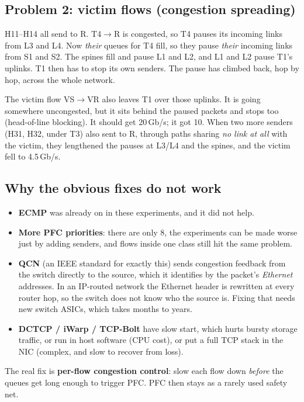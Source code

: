 \subsection{Problem 2: victim flows (congestion spreading)}

H11--H14 all send to R. T4$\to$R is congested, so T4 pauses its incoming links from L3 and L4. Now \emph{their} queues for T4 fill, so they pause
\emph{their} incoming links from S1 and S2. The spines fill and pause L1 and L2, and L1 and L2 pause T1's uplinks. T1 then has to stop its own
senders. The pause has climbed back, hop by hop, across the whole network.

The victim flow VS$\to$VR also leaves T1 over those uplinks. It is going somewhere uncongested, but it sits behind the paused packets and
stops too (head-of-line blocking). It should get 20\,Gb/s; it got 10. When two more senders (H31, H32, under T3) also sent to R, through paths
sharing \emph{no link at all} with the victim, they lengthened the pauses at L3/L4 and the spines, and the victim fell to 4.5\,Gb/s.

\subsection{Why the obvious fixes do not work}
\begin{itemize}
  \item \textbf{ECMP} was already on in these experiments, and it did not help.
  \item \textbf{More PFC priorities}: there are only 8, the experiments can be made worse just by adding senders, and flows inside one class still
        hit the same problem.
  \item \textbf{QCN} (an IEEE standard for exactly this) sends congestion feedback from the switch directly to the source, which it identifies by the
        packet's \emph{Ethernet} addresses. In an IP-routed network the Ethernet header is rewritten at every router hop, so the switch does not know
        who the source is. Fixing that needs new switch ASICs, which takes months to years.
  \item \textbf{DCTCP / iWarp / TCP-Bolt} have slow start, which hurts bursty storage traffic, or run in host software (CPU cost), or put a full TCP
        stack in the NIC (complex, and slow to recover from loss).
\end{itemize}
The real fix is \textbf{per-flow congestion control}: slow each flow down \emph{before} the queues get long enough to trigger PFC. PFC then
stays as a rarely used safety net.

